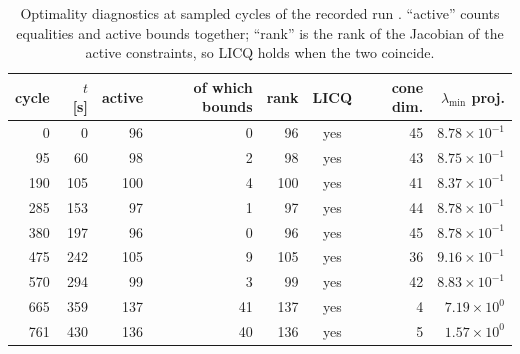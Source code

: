 \begin{table}[htbp]
  \centering
  \small
  \caption{Optimality diagnostics at sampled cycles of the recorded run \resBag. ``active'' counts equalities and active bounds together; ``rank'' is the rank of the Jacobian of the active constraints, so LICQ holds when the two coincide.}
  \label{res:tab:kkt}
  \begin{tabular}{rrrrrcrr}
    \toprule
    cycle & $t$ [s] & active & of which bounds & rank & LICQ & cone dim. & $\lambda_{\min}$ proj. \\
    \midrule
    0 & 0 & 96 & 0 & 96 & yes & 45 & $8.78\times 10^{-1}$ \\
    95 & 60 & 98 & 2 & 98 & yes & 43 & $8.75\times 10^{-1}$ \\
    190 & 105 & 100 & 4 & 100 & yes & 41 & $8.37\times 10^{-1}$ \\
    285 & 153 & 97 & 1 & 97 & yes & 44 & $8.78\times 10^{-1}$ \\
    380 & 197 & 96 & 0 & 96 & yes & 45 & $8.78\times 10^{-1}$ \\
    475 & 242 & 105 & 9 & 105 & yes & 36 & $9.16\times 10^{-1}$ \\
    570 & 294 & 99 & 3 & 99 & yes & 42 & $8.83\times 10^{-1}$ \\
    665 & 359 & 137 & 41 & 137 & yes & 4 & $7.19\times 10^{0}$ \\
    761 & 430 & 136 & 40 & 136 & yes & 5 & $1.57\times 10^{0}$ \\
    \bottomrule
  \end{tabular}
\end{table}

